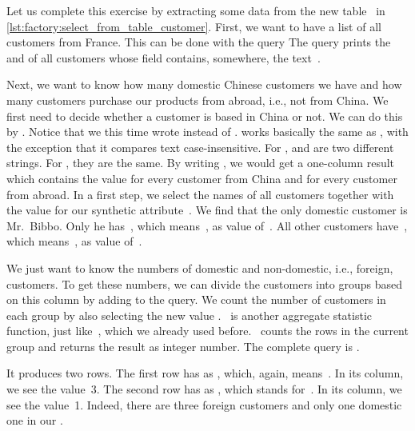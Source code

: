 %
%
%
%
%
Let us complete this exercise by extracting some data from the new table~ in \cref{lst:factory:select_from_table_customer}.
First, we want to have a list of all customers from France.
This can be done with the query 
The query prints the  and  of all customers whose  field contains, somewhere, the text~.

Next, we want to know how many domestic Chinese customers we have and how many customers purchase our products from abroad, i.e., not from China.
We first need to decide whether a customer is based in China or not.
We can do this by .
Notice that we this time wrote  instead of .
 works basically the same as , with the exception that it compares text case-insensitive.
For ,  and  are two different strings.
For , they are the same.
By writing , we would get a one-column result which contains the value  for every customer from China and  for every customer from abroad.
In a first step, we select the names of all customers together with the value for our synthetic attribute~.
We find that the only domestic customer is Mr.~Bibbo.
Only he has~, which means~, as value of~.
All other customers have~, which means~, as value of~.%
%
\begin{sloppypar}%
We just want to know the numbers of domestic and non-domestic, i.e., foreign, customers.
To get these numbers, we can divide the customers into groups based on this column  by adding  to the query.
We count the number of customers in each group by also selecting the new value .
~is another aggregate statistic function, just like~, which we already used before.
~counts the rows in the current group and returns the result as integer number.
The complete query is .
\end{sloppypar}%
%
It produces two rows.
The first row has  as , which, again, means~.
In its  column, we see the value~3.
The second row has  as , which stands for~.
In its  column, we see the value~1.
Indeed, there are three foreign customers and only one domestic one in our \db.

